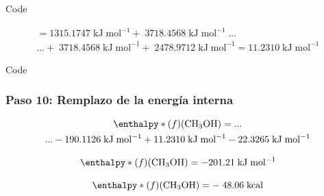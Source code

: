 \documentclass{beamer}
\begin{document}
\begin{frame}[fragile]{Code}

\begin{multline}
	[H(298.15)-H(0)]= 1315.1747\;\mathrm{kJ\;mol^{-1}} +\; 3718.4568\;\mathrm{kJ\;mol^{-1}}\;...\\...+\; 3718.4568\;\mathrm{kJ\;mol^{-1}} +\;2478.9712\;\mathrm{kJ\;mol^{-1}} = \mathrm{11.2310\;kJ\;mol^{-1}}
\label{eq:4.22}
\end{multline}
\end{frame}
\begin{frame}[fragile]{Code}
\frametitle{Paso 10: Remplazo de la energía interna}

\begin{multline}
	\enthalpy*(f){}\mathrm{(CH_3OH)} =... \\ ... -190.1126\;\mathrm{kJ\;mol^{-1}} + 11.2310\;\mathrm{kJ\;mol^{-1}} - \mathrm{22.3265\;kJ\;mol^{-1}}
\label{eq:4.23}
\end{multline}

\begin{equation}
	\enthalpy*(f){}\mathrm{(CH_3OH) = -201.21\;kJ\;mol^{-1}}
\label{eq:4.24}
\end{equation}


\begin{equation}
	\enthalpy*(f){}\mathrm{(CH_3OH) = -\;48.06\;kcal}
\label{eq:4.25}
\end{equation}
\end{frame}
\end{document}
